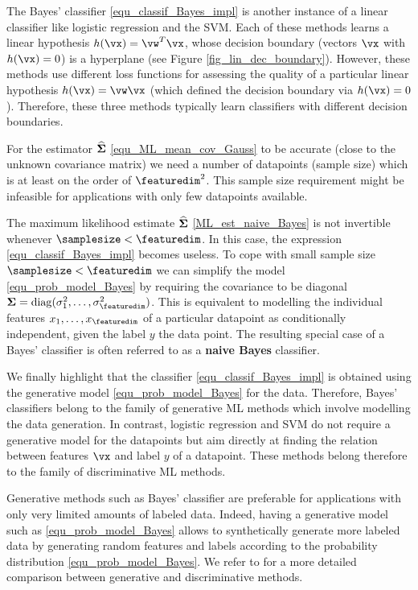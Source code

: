 \documentclass[12pt]{report}
\begin{document}
The Bayes' classifier \eqref{equ_classif_Bayes_impl} is another instance of a linear 
classifier like logistic regression and the SVM. Each of these methods learns a 
linear hypothesis $h(\vx)=\vw^{T} \vx$, whose decision boundary (vectors $\vx$ with $h(\vx)=0$) 
is a hyperplane (see Figure \ref{fig_lin_dec_boundary}). However, these methods 
use different loss functions for assessing the quality of a particular linear hypothesis 
$h(\vx)=\vw \vx$ (which defined the decision boundary via $h(\vx)=0$). 
Therefore, these three methods typically learn classifiers with different decision 
boundaries. 

For the estimator $\widehat{\bf \Sigma}$ \eqref{equ_ML_mean_cov_Gauss} 
to be accurate (close to the unknown covariance matrix) we need a number 
of datapoints (sample size) which is at least on the order of $\featuredim^{2}$. 
This sample size requirement might be infeasible for applications with only few 
datapoints available. 

The maximum likelihood estimate $\widehat{\bf \Sigma}$ \eqref{ML_est_naive_Bayes} 
is not invertible whenever $\samplesize < \featuredim$. In this case, the expression 
\eqref{equ_classif_Bayes_impl} becomes useless. To cope with small sample size 
$\samplesize < \featuredim$ we can simplify the model \eqref{equ_prob_model_Bayes} 
by requiring the covariance to be diagonal ${\bf \Sigma} = {\rm diag} (\sigma_{1}^{2}, \ldots, \sigma_{\featuredim}^{2})$. 
This is equivalent to modelling the individual features $x_{1},\ldots,x_{\featuredim}$ 
of a particular datapoint as conditionally independent, given the label $y$ the data 
point. The resulting special case of a Bayes' classifier is often referred to as a 
{\bf naive Bayes} classifier. 

We finally highlight that the classifier \eqref{equ_classif_Bayes_impl} 
is obtained using the generative model \eqref{equ_prob_model_Bayes} 
for the data. Therefore, Bayes' classifiers belong to the family of generative 
ML methods which involve modelling the data generation. In contrast, 
logistic regression and SVM do not require a generative model for the 
datapoints but aim directly at finding the relation between features $\vx$ 
and label $y$ of a datapoint. These methods belong therefore to the 
family of discriminative ML methods. 


Generative methods such as Bayes' classifier are preferable for 
applications with only very limited amounts of labeled data. Indeed, 
having a generative model such as \eqref{equ_prob_model_Bayes} 
allows to synthetically generate more labeled data by generating 
random features and labels according to the probability distribution 
\eqref{equ_prob_model_Bayes}. We refer to \cite{NIPS2001_2020} 
for a more detailed comparison between generative and discriminative 
methods. 
\end{document}
